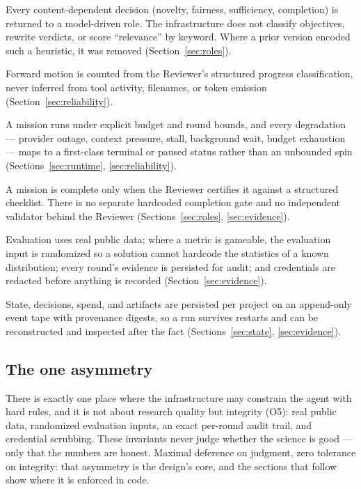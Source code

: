 \begin{description}[leftmargin=1.4em, style=nextline]
  \item[O1 --- Judgment stays with the agent.] Every content-dependent decision
    (novelty, fairness, sufficiency, completion) is returned to a model-driven
    role. The infrastructure does not classify objectives, rewrite verdicts, or
    score ``relevance'' by keyword. Where a prior version encoded such a
    heuristic, it was removed (Section~\ref{sec:roles}).
  \item[O2 --- Progress is measured, not inferred.] Forward motion is counted
    from the Reviewer's structured progress classification, never inferred from
    tool activity, filenames, or token emission (Section~\ref{sec:reliability}).
  \item[O3 --- Bounded and recoverable.] A mission runs under explicit budget and
    round bounds, and every degradation --- provider outage, context pressure,
    stall, background wait, budget exhaustion --- maps to a first-class terminal
    or paused status rather than an unbounded spin (Sections~\ref{sec:runtime},
    \ref{sec:reliability}).
  \item[O4 --- Completion has exactly one owner.] A mission is complete only when
    the Reviewer certifies it against a structured checklist. There is no separate
    hardcoded completion gate and no independent validator behind the Reviewer
    (Sections~\ref{sec:roles}, \ref{sec:evidence}).
  \item[O5 --- Measurement integrity by construction.] Evaluation uses real
    public data; where a metric is gameable, the evaluation input is randomized so
    a solution cannot hardcode the statistics of a known distribution; every
    round's evidence is persisted for audit; and credentials are redacted before
    anything is recorded (Section~\ref{sec:evidence}).
  \item[O6 --- Everything is auditable.] State, decisions, spend, and artifacts
    are persisted per project on an append-only event tape with provenance
    digests, so a run survives restarts and can be reconstructed and inspected
    after the fact (Sections~\ref{sec:state}, \ref{sec:evidence}).
\end{description}

\subsection{The one asymmetry}

There is exactly one place where the infrastructure may constrain the agent with
hard rules, and it is not about research quality but integrity (O5): real public
data, randomized evaluation inputs, an exact per-round audit trail, and credential
scrubbing. These invariants never judge whether the science is good --- only that
the numbers are honest. Maximal deference on judgment, zero tolerance on integrity:
that asymmetry is the design's core, and the sections that follow show where it is
enforced in code.
